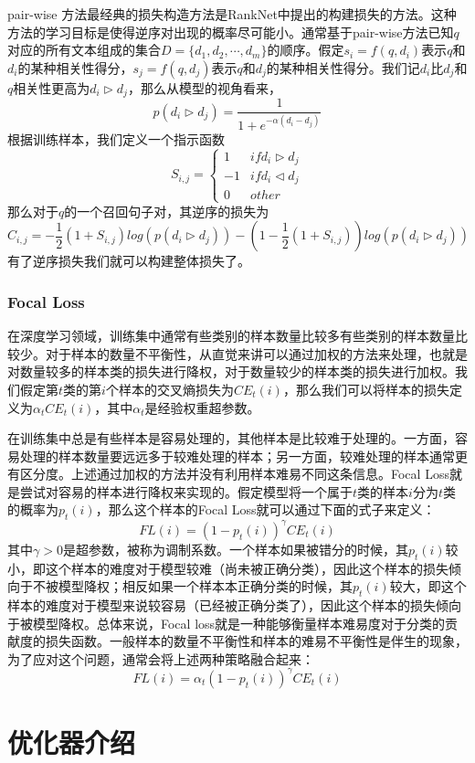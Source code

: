 \documentclass[twoside,a4paper,12pt]{book}%
\begin{document}
pair-wise 方法最经典的损失构造方法是RankNet中提出的构建损失的方法。这种方法的学习目标是使得逆序对出现的概率尽可能小。通常基于pair-wise方法已知$q$对应的所有文本组成的集合$D=\{d_1,d_2,\cdots,d_m\}$的顺序。假定$s_i=f(q,d_i)$表示$q$和$d_i$的某种相关性得分，$s_j=f(q,d_j)$表示$q$和$d_j$的某种相关性得分。我们记$d_i$比$d_j$和$q$相关性更高为$d_i\triangleright d_j$，那么从模型的视角看来，
$$
p(d_i\triangleright d_j)=\frac{1}{1+e^{-\alpha(d_i-d_j)}}
$$
根据训练样本，我们定义一个指示函数
$$
S_{i,j}=
    \begin{cases}
        1   & if d_i \triangleright d_j\\
        -1  & if d_i \triangleleft d_j\\
        0   & other
    \end{cases}  
$$
那么对于$q$的一个召回句子对，其逆序的损失为
$$
C_{i,j}=-\frac{1}{2}(1+S_{i,j})log(p(d_i\triangleright d_j))-
(1-\frac{1}{2}(1+S_{i,j}))log(p(d_i\triangleright d_j))
$$
有了逆序损失我们就可以构建整体损失了。

\subsubsection{Focal Loss}
在深度学习领域，训练集中通常有些类别的样本数量比较多有些类别的样本数量比较少。对于样本的数量不平衡性，从直觉来讲可以通过加权的方法来处理，也就是对数量较多的样本类的损失进行降权，对于数量较少的样本类的损失进行加权。我们假定第$t$类的第$i$个样本的交叉熵损失为$CE_t(i)$，那么我们可以将样本的损失定义为$\alpha_{t}CE_t(i)$，其中$\alpha_{t}$是经验权重超参数。

在训练集中总是有些样本是容易处理的，其他样本是比较难于处理的。一方面，容易处理的样本数量要远远多于较难处理的样本；另一方面，较难处理的样本通常更有区分度。上述通过加权的方法并没有利用样本难易不同这条信息。Focal Loss就是尝试对容易的样本进行降权来实现的。假定模型将一个属于$t$类的样本$i$分为$t$类的概率为$p_t(i)$，那么这个样本的Focal Loss就可以通过下面的式子来定义：
$$
FL(i)=(1-p_t(i))^{\gamma}CE_t(i)
$$
其中$\gamma>0$是超参数，被称为调制系数。一个样本如果被错分的时候，其$p_t(i)$较小，即这个样本的难度对于模型较难（尚未被正确分类），因此这个样本的损失倾向于不被模型降权；相反如果一个样本本正确分类的时候，其$p_t(i)$较大，即这个样本的难度对于模型来说较容易（已经被正确分类了），因此这个样本的损失倾向于被模型降权。总体来说，Focal loss就是一种能够衡量样本难易度对于分类的贡献度的损失函数。一般样本的数量不平衡性和样本的难易不平衡性是伴生的现象，为了应对这个问题，通常会将上述两种策略融合起来：
$$
FL(i)=\alpha_{t}(1-p_t(i))^{\gamma}CE_t(i)
$$
\section{优化器介绍}
\end{document}

